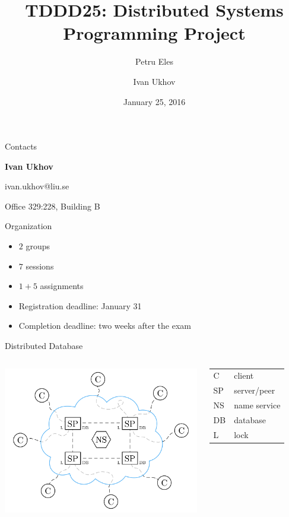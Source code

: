 \documentclass[compress,xcolor=table]{beamer}
\title{%
  TDDD25: Distributed Systems\\%
  \vspace{0.1em}%
  Programming Project%
}
\author{Petru Eles \and Ivan Ukhov}
\date{January 25, 2016}
\institute[Link\"oping University]{
  Computer and Information Science\\
  Link\"oping University
}
\begin{document}
\frame[plain]{\titlepage}

\begin{frame}{Contacts}
\begin{center}
  \textbf{Ivan Ukhov}
  \vspace{1em}

  ivan.ukhov@liu.se

  Office 329:228, Building B
\end{center}
\end{frame}

\begin{frame}{Organization}
\begin{itemize}
  \item $2$ groups
  \item $7$ sessions
  \item $1 + 5$ assignments
  \item Registration deadline: January 31
  \item Completion deadline: two weeks after the exam
\end{itemize}
\end{frame}

\begin{frame}{Distributed Database}
\begin{columns}
  \column{7cm}
  \centering
  \includegraphics[scale=0.14,page=1]{include/assets/distributed-database}
  \column{3cm}
  \begin{tabular}{l @{ --- } l}
    \alert{C}  & client \\
    \alert{SP} & server/peer \\
    \alert{NS} & name service \\
    \alert{DB} & database \\
    \alert{L}  & lock
  \end{tabular}
\end{columns}
\end{frame}
\end{document}
